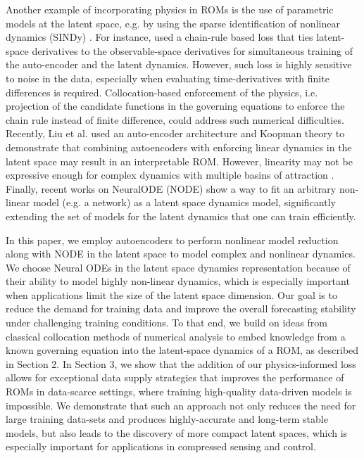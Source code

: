         Another example of incorporating physics in ROMs is the use of parametric models at the latent space, e.g. by using the sparse identification of nonlinear dynamics (SINDy) \cite{brunton2016discovering,champion2019data}. For instance, \cite{fries2022lasdi,he2022glasdi} used a chain-rule based loss that ties latent-space derivatives to the observable-space derivatives for simultaneous training of the auto-encoder and the latent dynamics. However, such loss is highly sensitive to noise in the data, especially when evaluating time-derivatives with finite differences is required\cite{delahunt2022sindynoise}. 
        Collocation-based enforcement of the physics, i.e. projection of the candidate functions in the governing equations to enforce the chain rule instead of finite difference, could address such numerical difficulties. Recently, Liu et al. \cite{liu2022physics} used an auto-encoder architecture and Koopman theory to demonstrate that combining autoencoders with enforcing linear dynamics in the latent space may result in an interpretable ROM. However, linearity may not be expressive enough for complex dynamics with multiple basins of attraction \cite{page2019koopman}.
        Finally, recent works on NeuralODE (NODE) \cite{chen2018neuralode,rackauckas2020udes} show a way to fit an arbitrary non-linear model (e.g. a network) as a latent space dynamics model, significantly extending the set of models for the latent dynamics that one can train efficiently. 
        
        In this paper, we employ autoencoders to perform nonlinear model reduction along with NODE in the latent space to model complex and nonlinear dynamics. We choose Neural ODEs in the latent space dynamics representation because of their ability to model highly non-linear dynamics, which is especially important when applications limit the size of the latent space dimension. Our goal is to reduce the demand for training data and improve the overall forecasting stability under challenging training conditions. To that end, we build on ideas from classical collocation methods of numerical analysis to embed knowledge from a known governing equation into the latent-space dynamics of a ROM, as described in Section 2. In Section 3, we show that the addition of our physics-informed loss allows for exceptional data supply strategies that improves the performance of ROMs in data-scarce settings, where training high-quality data-driven models is impossible. We demonstrate that such an approach not only reduces the need for large training data-sets and produces highly-accurate and long-term stable models, but also leads to the discovery of more compact latent spaces, which is especially important for applications in compressed sensing and control.

